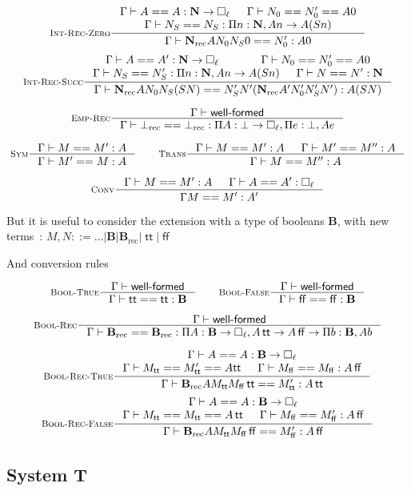 \documentclass[11pt]{article}
\DeclareMathOperator{\rec}{rec}
\DeclareMathOperator{\true}{\mathsf{tt}}
\DeclareMathOperator{\false}{\mathsf{ff}}
\newcommand{\0}{\mathbf{0}}
\newcommand{\1}{\mathbf{1}}
\newcommand{\nat}{\mathbf{N}}
\newcommand{\bool}{\mathbf{B}}
\newcommand{\tctx}{\Gamma}
\newcommand{\Wf}{\textsf{well-formed}}
\begin{document}
$$
    \inference[\textsc{Int-Rec-Zero}]{\tctx |- A == A : \nat -> \square_\ell & \tctx |- N_0 == N'_0 == A 0\\ \tctx |- N_S == N_S : \Pi n:\nat, A n -> A(S n)}{\tctx |- \nat_{\rec} A N_0N_S0 == N'_0 : A 0}
$$
$$
    \inference[\textsc{Int-Rec-Succ}]{\tctx |- A == A' : \nat -> \square_\ell & \tctx |- N_0 == N'_0 == A 0\\ \tctx |- N_S == N'_S : \Pi n:\nat, A n -> A(S n) & \tctx |- N == N' :\nat}{\tctx |- \nat_{\rec} A N_0N_S (S N) == N'_S N' (\nat_{\rec}A' N'_0 N'_S N') : A (S N)}
$$


$$
    \inference[\textsc{Emp-Rec}]{\tctx |- \Wf}{\tctx |- \bot_{\rec} == \bot_{\rec} : \Pi A : \bot \to \square_\ell,\Pi e :\bot, A e}
$$

$$
    \inference[\textsc{Sym}]{\tctx |- M == M' : A}{\tctx |- M' == M : A} \qquad
    \inference[\textsc{Trans}]
    {\tctx |- M == M' :A & \tctx |- M' == M'' : A}{\tctx |- M == M'' : A}
$$

$$
    \inference[\textsc{Conv}]
    {\tctx |- M == M' :A & \tctx |- A == A' : \square_\ell}{\tctx M ==M' : A'}
$$

But it is useful to consider the extension with a type of booleans $\bool$, with new terms~:
 $ M,N ::= \dots | \bool|\bool_{\rec}|\true|\false$

 And conversion rules

$$
    \inference[\textsc{Bool-True}]{\tctx |- \Wf}{\tctx |- \true == \true : \bool} \qquad
    \inference[\textsc{Bool-False}]{\tctx |- \Wf}{\tctx |- \false == \false : \bool}
$$

$$
    \inference[\textsc{Bool-Rec}]{\tctx |- \Wf}{\tctx |- \bool_{\rec} == \bool_{\rec} : \Pi A : \bool \to \square_\ell, A \true \to A\false \to \Pi b :\bool, A b}
$$


$$
    \inference[\textsc{Bool-Rec-True}]{\tctx |- A == A : \bool -> \square_\ell \\ \tctx |- M_{\true} == M'_{\true} == A {\true} & \tctx |- M_{\false} == M_{\false} : A \false}{\tctx |- \bool_{\rec} A M_{\true} M_{\false} \true == M'_{\true} : A \true}
$$
$$
    \inference[\textsc{Bool-Rec-False}]{\tctx |- A == A : \bool -> \square_\ell \\ \tctx |- M_{\true} == M_{\true} == A \true & \tctx |- M_{\false} == M'_{\false} : A \false}{\tctx |- \bool_{\rec} A M_{\true} M_{\false} \false == M'_{\false} : A \false}
$$

\subsection{System T}
\end{document}
